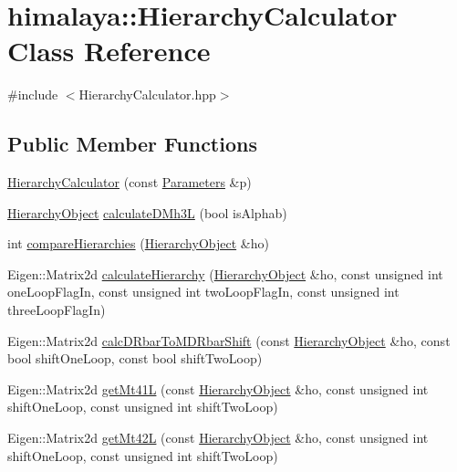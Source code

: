 \hypertarget{classhimalaya_1_1HierarchyCalculator}{}\section{himalaya\+:\+:Hierarchy\+Calculator Class Reference}
\label{classhimalaya_1_1HierarchyCalculator}


{\ttfamily \#include $<$Hierarchy\+Calculator.\+hpp$>$}

\subsection*{Public Member Functions}
\begin{DoxyCompactItemize}
\item 
\hyperlink{classhimalaya_1_1HierarchyCalculator_a8d1d3911a84f05c234e0f66bd80d77e4}{Hierarchy\+Calculator} (const \hyperlink{structhimalaya_1_1Parameters}{Parameters} \&p)
\item 
\hyperlink{classhimalaya_1_1HierarchyObject}{Hierarchy\+Object} \hyperlink{classhimalaya_1_1HierarchyCalculator_a7e64bcd7dc47bde2b837ee2b2d219a84}{calculate\+D\+Mh3L} (bool is\+Alphab)
\item 
int \hyperlink{classhimalaya_1_1HierarchyCalculator_a6ae7d2bf7742c1a961a79bab4c860378}{compare\+Hierarchies} (\hyperlink{classhimalaya_1_1HierarchyObject}{Hierarchy\+Object} \&ho)
\item 
Eigen\+::\+Matrix2d \hyperlink{classhimalaya_1_1HierarchyCalculator_aa9a5d68155fa1b5d7376d9bf08470946}{calculate\+Hierarchy} (\hyperlink{classhimalaya_1_1HierarchyObject}{Hierarchy\+Object} \&ho, const unsigned int one\+Loop\+Flag\+In, const unsigned int two\+Loop\+Flag\+In, const unsigned int three\+Loop\+Flag\+In)
\item 
Eigen\+::\+Matrix2d \hyperlink{classhimalaya_1_1HierarchyCalculator_ab0e05fd01311e162d50acc741dcc9f8b}{calc\+D\+Rbar\+To\+M\+D\+Rbar\+Shift} (const \hyperlink{classhimalaya_1_1HierarchyObject}{Hierarchy\+Object} \&ho, const bool shift\+One\+Loop, const bool shift\+Two\+Loop)
\item 
Eigen\+::\+Matrix2d \hyperlink{classhimalaya_1_1HierarchyCalculator_a2366610066b408bbad9aeba98ada07fb}{get\+Mt41L} (const \hyperlink{classhimalaya_1_1HierarchyObject}{Hierarchy\+Object} \&ho, const unsigned int shift\+One\+Loop, const unsigned int shift\+Two\+Loop)
\item 
Eigen\+::\+Matrix2d \hyperlink{classhimalaya_1_1HierarchyCalculator_aa35b62a12a4f97b77830abf292858b05}{get\+Mt42L} (const \hyperlink{classhimalaya_1_1HierarchyObject}{Hierarchy\+Object} \&ho, const unsigned int shift\+One\+Loop, const unsigned int shift\+Two\+Loop)

\end{DoxyCompactItemize}
